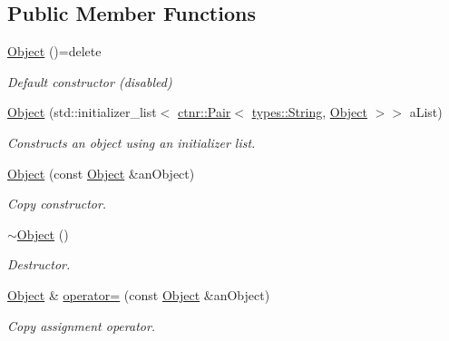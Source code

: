 \subsection*{Public Member Functions}
\begin{DoxyCompactItemize}
\item 
\mbox{\hyperlink{classlibrary_1_1core_1_1ctnr_1_1_object_a51bb72dec3a1b2738e0ad92b977b8d8d}{Object}} ()=delete
\begin{DoxyCompactList}\small\item\em Default constructor (disabled) \end{DoxyCompactList}\item 
\mbox{\hyperlink{classlibrary_1_1core_1_1ctnr_1_1_object_a351131c4c1d6d7bd4f488ba99d7bf2d5}{Object}} (std\+::initializer\+\_\+list$<$ \mbox{\hyperlink{namespacelibrary_1_1core_1_1ctnr_aad6f8de4c0f279c10436d59d4ace74bd}{ctnr\+::\+Pair}}$<$ \mbox{\hyperlink{classlibrary_1_1core_1_1types_1_1_string}{types\+::\+String}}, \mbox{\hyperlink{classlibrary_1_1core_1_1ctnr_1_1_object}{Object}} $>$$>$ a\+List)
\begin{DoxyCompactList}\small\item\em Constructs an object using an initializer list. \end{DoxyCompactList}\item 
\mbox{\hyperlink{classlibrary_1_1core_1_1ctnr_1_1_object_a90f9c4579306498a5da413ac89ac0109}{Object}} (const \mbox{\hyperlink{classlibrary_1_1core_1_1ctnr_1_1_object}{Object}} \&an\+Object)
\begin{DoxyCompactList}\small\item\em Copy constructor. \end{DoxyCompactList}\item 
\mbox{\hyperlink{classlibrary_1_1core_1_1ctnr_1_1_object_a18a5350937267e55df0a76f5ce154a7a}{$\sim$\+Object}} ()
\begin{DoxyCompactList}\small\item\em Destructor. \end{DoxyCompactList}\item 
\mbox{\hyperlink{classlibrary_1_1core_1_1ctnr_1_1_object}{Object}} \& \mbox{\hyperlink{classlibrary_1_1core_1_1ctnr_1_1_object_a48f26f6297266090793fc53862654122}{operator=}} (const \mbox{\hyperlink{classlibrary_1_1core_1_1ctnr_1_1_object}{Object}} \&an\+Object)
\begin{DoxyCompactList}\small\item\em Copy assignment operator. \end{DoxyCompactList}\item 
$$
\end{DoxyCompactItemize}
